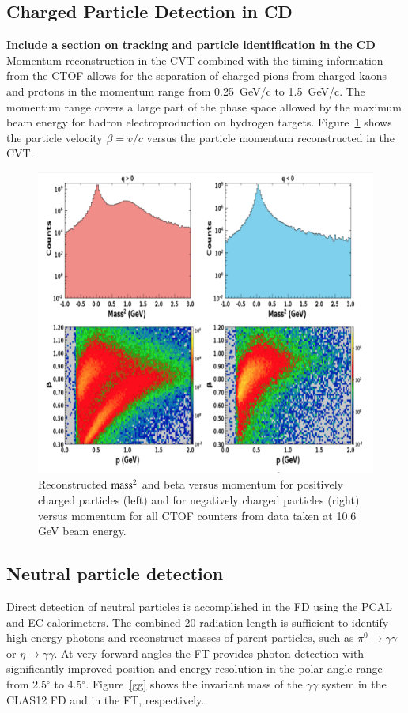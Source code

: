 \documentclass[final,3p,times,twocolumn,authoryear]{elsarticle}
\begin{document}
\subsection{\rm Charged Particle Detection in CD} 
{\bf Include a section on tracking and particle identification in the CD}
Momentum reconstruction in the CVT combined with the timing information from the CTOF allows for the separation 
of charged pions from charged kaons and protons in the momentum range from 0.25~GeV/c to 1.5~GeV/c. The momentum
range covers a large part of the phase space allowed by the maximum beam energy for hadron electroproduction 
on hydrogen targets. Figure~\ref{CD-PID} shows the particle velocity $\beta = v/c$ versus the particle momentum 
reconstructed in the CVT.
\begin{figure}[htbp!]
\centerline{\includegraphics[width=1.0\columnwidth]{CTOF-PID.png}}
\caption{Reconstructed $\rm mass^2$ and beta versus momentum for positively charged particles (left) and for negatively charged 
particles (right) versus momentum for all CTOF counters from data taken at 10.6 GeV beam energy.  }
\label{CD-PID}
\end{figure} 


\subsection{\rm Neutral particle detection} 
Direct detection of neutral particles is accomplished in the FD using the PCAL and EC calorimeters. 
The combined 20 radiation length is sufficient to identify high energy photons and reconstruct masses 
of parent particles, such as $\pi^0\to \gamma \gamma$  or $\eta \to \gamma \gamma$. 
 At very forward angles the FT provides photon detection with significantly improved position and 
 energy resolution in the polar angle range from 2.5$^\circ$ to 4.5$^\circ$. Figure~\ref{gg} 
shows the invariant mass of the $\gamma\gamma$ system in the CLAS12 FD and in the FT, respectively. 
\end{document}
